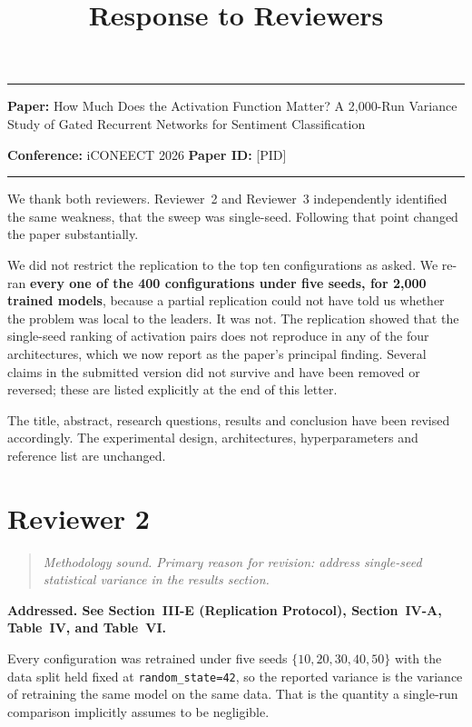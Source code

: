 \documentclass[10pt,a4paper]{article}
\title{\vspace{-1.5em}Response to Reviewers\vspace{-0.5em}}
\author{}
\date{}
\newenvironment{rev}%
  {\begin{quote}\itshape\color{quotegray}}%
  {\end{quote}}
\newcommand{\pt}[1]{\textbf{#1}}
\begin{document}
\maketitle
\vspace{-3em}

\noindent\rule{\textwidth}{0.8pt}

\textbf{Paper:} How Much Does the Activation Function Matter?
A 2{,}000-Run Variance Study of Gated Recurrent Networks for
Sentiment Classification

\textbf{Conference:} iCONEECT 2026 \quad\textbf{Paper ID:} [PID]

\noindent\rule{\textwidth}{0.8pt}

We thank both reviewers. Reviewer~2 and Reviewer~3 independently
identified the same weakness, that the sweep was single-seed.
Following that point changed the paper substantially.

We did not restrict the replication to the top ten configurations
as asked. We re-ran \pt{every one of the 400 configurations under
five seeds, for 2{,}000 trained models}, because a partial
replication could not have told us whether the problem was local to
the leaders. It was not. The replication showed that the
single-seed ranking of activation pairs does not reproduce in any
of the four architectures, which we now report as the paper's
principal finding. Several claims in the submitted version did not
survive and have been removed or reversed; these are listed
explicitly at the end of this letter.

The title, abstract, research questions, results and conclusion
have been revised accordingly. The experimental design,
architectures, hyperparameters and reference list are unchanged.

\section*{Reviewer 2}

\begin{rev}
Methodology sound. Primary reason for revision: address single-seed
statistical variance in the results section.
\end{rev}

\noindent\pt{Addressed. See Section~III-E (Replication Protocol),
Section~IV-A, Table~IV, and Table~VI.}

Every configuration was retrained under five seeds
$\{10,20,30,40,50\}$ with the data split held fixed at
\texttt{random\_state=42}, so the reported variance is the variance
of retraining the same model on the same data. That is the quantity
a single-run comparison implicitly assumes to be negligible.
\end{document}
